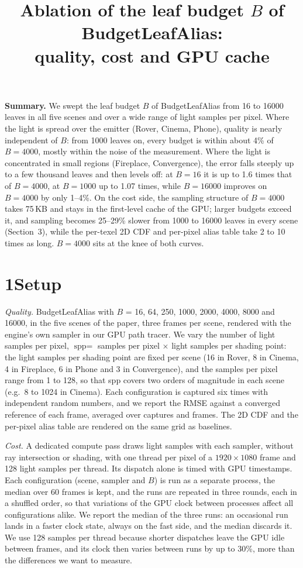 \documentclass[10pt]{article}
\title{\vspace{-1.6em}Ablation of the leaf budget $B$ of BudgetLeafAlias:\\ quality, cost and GPU cache}
\author{}
\date{\vspace{-2.4em}}
\begin{document}
\maketitle
\vspace{-1.0em}

\textbf{Summary.} We swept the leaf budget $B$ of BudgetLeafAlias from 16 to 16000 leaves in all five scenes and over a wide range of light samples per pixel. Where the light is spread over the emitter (Rover, Cinema, Phone), quality is nearly independent of $B$: from 1000 leaves on, every budget is within about 4\% of $B=4000$, mostly within the noise of the measurement. Where the light is concentrated in small regions (Fireplace, Convergence), the error falls steeply up to a few thousand leaves and then levels off: at $B=16$ it is up to 1.6 times that of $B=4000$, at $B=1000$ up to 1.07 times, while $B=16000$ improves on $B=4000$ by only 1--4\%. On the cost side, the sampling structure of $B=4000$ takes 75\,KB and stays in the first-level cache of the GPU; larger budgets exceed it, and sampling becomes 25--29\% slower from 1000 to 16000 leaves in every scene (Section~3), while the per-texel 2D CDF and per-pixel alias table take 2 to 10 times as long. $B=4000$ sits at the knee of both curves.

\section*{1\quad Setup}

\emph{Quality.} BudgetLeafAlias with $B$ = 16, 64, 250, 1000, 2000, 4000, 8000 and 16000, in the five scenes of the paper, three frames per scene, rendered with the engine's own sampler in our GPU path tracer. We vary the number of light samples per pixel, $\text{spp} = $ samples per pixel $\times$ light samples per shading point: the light samples per shading point are fixed per scene (16 in Rover, 8 in Cinema, 4 in Fireplace, 6 in Phone and 3 in Convergence), and the samples per pixel range from 1 to 128, so that spp covers two orders of magnitude in each scene (e.g.\ 8 to 1024 in Cinema). Each configuration is captured six times with independent random numbers, and we report the RMSE against a converged reference of each frame, averaged over captures and frames. The 2D CDF and the per-pixel alias table are rendered on the same grid as baselines.

\emph{Cost.} A dedicated compute pass draws light samples with each sampler, without ray intersection or shading, with one thread per pixel of a $1920\times1080$ frame and 128 light samples per thread. Its dispatch alone is timed with GPU timestamps. Each configuration (scene, sampler and $B$) is run as a separate process, the median over 60 frames is kept, and the runs are repeated in three rounds, each in a shuffled order, so that variations of the GPU clock between processes affect all configurations alike. We report the median of the three runs: an occasional run lands in a faster clock state, always on the fast side, and the median discards it. We use 128 samples per thread because shorter dispatches leave the GPU idle between frames, and its clock then varies between runs by up to 30\%, more than the differences we want to measure.
\end{document}
